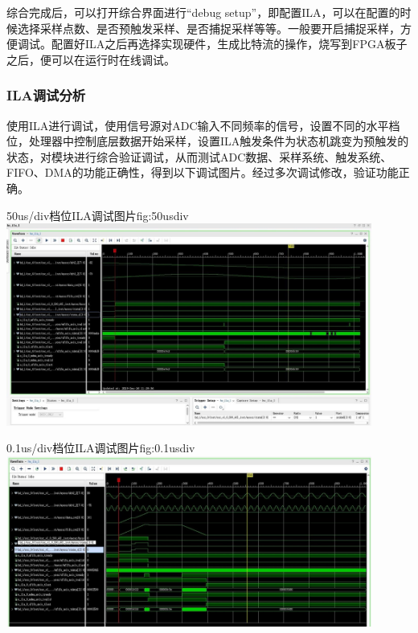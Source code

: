 \documentclass[supercite]{HustGraduPaper}
\begin{document}

	综合完成后，可以打开综合界面进行“debug setup”，即配置ILA，可以在配置的时候选择采样点数、是否预触发采样、是否捕捉采样等等。一般要开启捕捉采样，方便调试。配置好ILA之后再选择实现硬件，生成比特流的操作，烧写到FPGA板子之后，便可以在运行时在线调试。
	
	
	\subsubsection{ILA调试分析}
	
	使用ILA进行调试，使用信号源对ADC输入不同频率的信号，设置不同的水平档位，处理器中控制底层数据开始采样，设置ILA触发条件为状态机跳变为预触发的状态，对模块进行综合验证调试，从而测试ADC数据、采样系统、触发系统、FIFO、DMA的功能正确性，得到以下调试图片。经过多次调试修改，验证功能正确。
	
	\begin{generalfig}[htb]{50us/div档位ILA调试图片}{fig:50usdiv}
		\includegraphics[width=12cm]{Figures/50usdiv.jpg}
	\end{generalfig}
	
	\begin{generalfig}[htb]{0.1us/div档位ILA调试图片}{fig:0.1usdiv}
		\includegraphics[width=12cm]{Figures/0.1usdiv.jpg}
	\end{generalfig}
\end{document}
